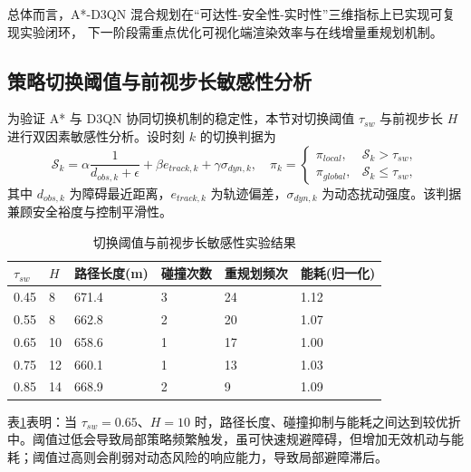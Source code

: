 \documentclass[UTF8,zihao=-4,a4paper,oneside,openany]{ctexrep}
\numberwithin{equation}{chapter}
\renewcommand{\small}{\normalsize}
\renewcommand{\small}{\normalsize}
\theoremstyle{plain}
\theoremstyle{definition}
\begin{document}
总体而言，A*-D3QN 混合规划在“可达性-安全性-实时性”三维指标上已实现可复现实验闭环，
下一阶段需重点优化可视化端渲染效率与在线增量重规划机制。

\subsection{策略切换阈值与前视步长敏感性分析}
\label{subsec:ch6_switch_sensitivity}

为验证 A* 与 D3QN 协同切换机制的稳定性，本节对切换阈值 $\tau_{sw}$ 与前视步长 $H$ 进行双因素敏感性分析。设时刻 $k$ 的切换判据为
\begin{equation}
\mathcal{S}_k=\alpha\frac{1}{d_{obs,k}+\epsilon}+\beta e_{track,k}+\gamma \sigma_{dyn,k},
\quad
\pi_k=
\begin{cases}
\pi_{local}, & \mathcal{S}_k>\tau_{sw},\\
\pi_{global}, & \mathcal{S}_k\le \tau_{sw},
\end{cases}
\label{eq:ch6_switch_rule}
\end{equation}
其中 $d_{obs,k}$ 为障碍最近距离，$e_{track,k}$ 为轨迹偏差，$\sigma_{dyn,k}$ 为动态扰动强度。该判据兼顾安全裕度与控制平滑性。

\begin{table}[H]
\centering
\small
\caption{切换阈值与前视步长敏感性实验结果}
\label{tab:ch6_switch_sensitivity}
\begin{tabular}{p{}p{}p{}p{}p{}p{}}
\toprule
$\tau_{sw}$ & $H$ & 路径长度(m) & 碰撞次数 & 重规划频次 & 能耗(归一化) \\
\midrule
0.45 & 8  & 671.4 & 3 & 24 & 1.12 \\
0.55 & 8  & 662.8 & 2 & 20 & 1.07 \\
0.65 & 10 & 658.6 & 1 & 17 & 1.00 \\
0.75 & 12 & 660.1 & 1 & 13 & 1.03 \\
0.85 & 14 & 668.9 & 2 & 9  & 1.09 \\
\bottomrule
\end{tabular}
\end{table}

表\ref{tab:ch6_switch_sensitivity}表明：当 $\tau_{sw}=0.65$、$H=10$ 时，路径长度、碰撞抑制与能耗之间达到较优折中。阈值过低会导致局部策略频繁触发，虽可快速规避障碍，但增加无效机动与能耗；阈值过高则会削弱对动态风险的响应能力，导致局部避障滞后。
\end{document}
